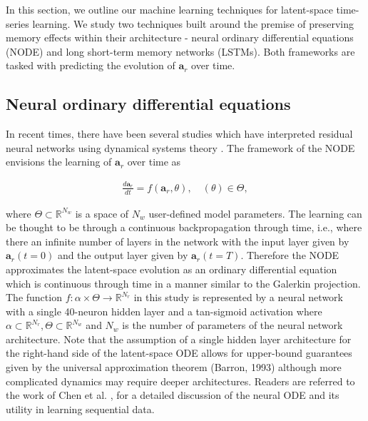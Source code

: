 \documentclass[preprint,12pt]{elsarticle}
\begin{document}
In this section, we outline our machine learning techniques for latent-space time-series learning. We study two techniques built around the premise of preserving memory effects within their architecture - neural ordinary differential equations (NODE) and long short-term memory networks (LSTMs). Both frameworks are tasked with predicting the evolution of $\mathbf{a}_r$ over time. 

\subsection{Neural ordinary differential equations}

In recent times, there have been several studies which have interpreted residual neural networks using dynamical systems theory \cite{haber2017stable,ruthotto2018deep,behrmann2018invertible,reshniak2019robust}. The framework of the NODE \cite{chen2018neural} envisions the learning of $\mathbf{a}_r$ over time as
\begin{linenomath*}
\begin{align}
\frac{d \mathbf{a}_r}{d t}=f(\mathbf{a}_r, \theta), \quad (\theta) \in \Theta,
\end{align}
\end{linenomath*}
where $\Theta \subset \mathbb{R}^{N_w}$ is a space of $N_w$ user-defined model parameters. The learning can be thought to be through a continuous backpropagation through time, i.e., where there an infinite number of layers in the network with the input layer given by $\mathbf{a}_r(t=0)$ and the output layer given by $\mathbf{a}_r(t=T)$. Therefore the NODE approximates the latent-space evolution as an ordinary differential equation which is continuous through time in a manner similar to the Galerkin projection. The function $f : \alpha \times \Theta \rightarrow \mathbb{R}^{N_r}$ in this study is represented by a neural network with a single 40-neuron hidden layer and a tan-sigmoid activation where $\alpha \subset \mathbb{R}^{N_r}, \Theta \subset \mathbb{R}^{N_w}$ and $N_w$ is the number of parameters of the neural network architecture. Note that the assumption of a single hidden layer architecture for the right-hand side of the latent-space ODE allows for upper-bound guarantees given by the universal approximation theorem (Barron, 1993) although more complicated dynamics may require deeper architectures. Readers are referred to the work of Chen et al. \cite{chen2018neural}, for a detailed discussion of the neural ODE and its utility in learning sequential data. 
\end{document}
